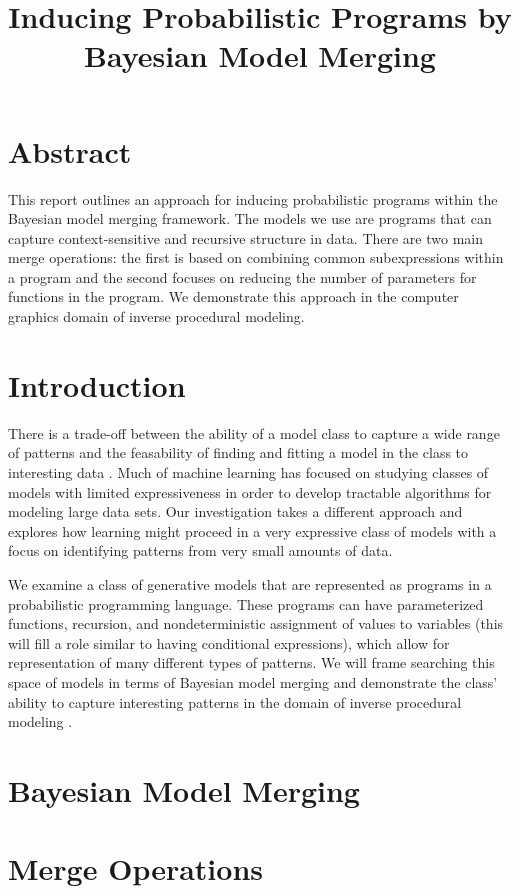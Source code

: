 \documentclass[a4paper,10pt]{article}
\begin{document}
\title{Inducing Probabilistic Programs by Bayesian Model Merging}
\date{}
\maketitle
\section{Abstract}
This report outlines an approach for inducing probabilistic programs within the Bayesian model merging framework.  The models we use are programs that can capture context-sensitive and recursive structure in data.  There are two main merge operations: the first is based on combining common subexpressions within a program and the second focuses on reducing the number of parameters for functions in the program.  We demonstrate this approach in the computer graphics domain of inverse procedural modeling.


\section{Introduction}
There is a trade-off between the ability of a model class to capture a wide range of patterns and the feasability of finding and fitting a model in the class to interesting data \cite{ai modern approach?}.  Much of machine learning has focused on studying classes of models with limited expressiveness in order to develop tractable algorithms for modeling large data sets.  Our investigation takes a different approach and explores how learning might proceed in a very expressive class of models with a focus on identifying patterns from very small amounts of data.  

We examine a class of generative models that are represented as programs in a probabilistic programming language.  These programs can have parameterized functions, recursion, and nondeterministic assignment of values to variables (this will fill a role similar to having conditional expressions), which allow for representation of many different types of patterns.  We will frame searching this space of models in terms of Bayesian model merging \cite{bmm} and demonstrate the class' ability to capture interesting patterns in the domain of inverse procedural modeling \cite{invprocmodel}.
\section{Bayesian Model Merging}

\section{Merge Operations}
\end{document}
